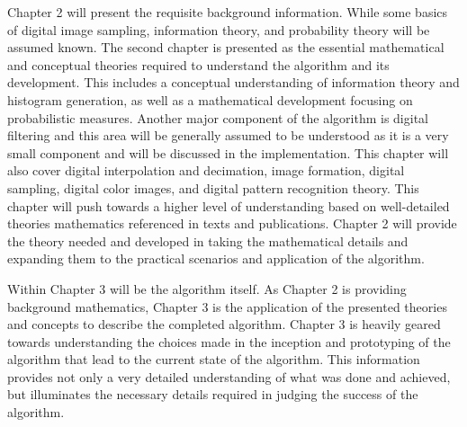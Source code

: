 %
%
%
%
%
%
%
%
%

%
%
%



Chapter 2 will present the requisite background information. While some basics of digital image sampling, information theory, and probability theory will be assumed known. The second chapter is presented as the essential mathematical and conceptual theories required to understand the algorithm and its development. This includes a conceptual understanding of information theory and histogram generation, as well as a mathematical development focusing on probabilistic measures. Another major component of the algorithm is digital filtering and this area will be generally assumed to be understood as it is a very small component and will be discussed in the implementation. This chapter will also cover digital interpolation and decimation, image formation, digital sampling, digital color images, and digital pattern recognition theory. This chapter will push towards a higher level of understanding based on well-detailed theories mathematics referenced in texts and publications. Chapter 2 will provide the theory needed and developed in taking the mathematical details and expanding them to the practical scenarios and application of the algorithm.

Within Chapter 3 will be the algorithm itself. As Chapter 2 is providing background mathematics, Chapter 3 is the application of the presented theories and concepts to describe the completed algorithm. Chapter 3 is heavily geared towards understanding the choices made in the inception and prototyping of the algorithm that lead to the current state of the algorithm. This information provides not only a very detailed understanding of what was done and achieved, but illuminates the necessary details required in judging the success of the algorithm.

